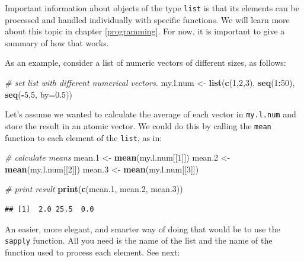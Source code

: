 \documentclass[11pt,]{book}
\newenvironment{Shaded}{\begin{snugshade}}{\end{snugshade}}
\newcommand{\KeywordTok}[1]{\textcolor[rgb]{0.27,0.27,0.27}{\textbf{#1}}}
\newcommand{\DataTypeTok}[1]{\textcolor[rgb]{0.27,0.27,0.27}{#1}}
\newcommand{\DecValTok}[1]{\textcolor[rgb]{0.06,0.06,0.06}{#1}}
\newcommand{\FloatTok}[1]{\textcolor[rgb]{0.06,0.06,0.06}{#1}}
\newcommand{\StringTok}[1]{\textcolor[rgb]{0.5,0.5,0.5}{#1}}
\newcommand{\CommentTok}[1]{\textcolor[rgb]{0.56,0.35,0.01}{\textit{#1}}}
\newcommand{\OperatorTok}[1]{\textcolor[rgb]{0.81,0.36,0.00}{\textbf{#1}}}
\newcommand{\NormalTok}[1]{#1}
\begin{document}
Important information about objects of the type \texttt{list} is that
its elements can be processed and handled individually with specific
functions. We will learn more about this topic in chapter
\ref{programming}. For now, it is important to give a summary of how
that works.

As an example, consider a list of numeric vectors of different sizes, as
follows:

\begin{Shaded}
\begin{Highlighting}[]
\CommentTok{# set list with different numerical vectors.}
\NormalTok{my.l.num <-}\StringTok{ }\KeywordTok{list}\NormalTok{(}\KeywordTok{c}\NormalTok{(}\DecValTok{1}\NormalTok{,}\DecValTok{2}\NormalTok{,}\DecValTok{3}\NormalTok{), }
                 \KeywordTok{seq}\NormalTok{(}\DecValTok{1}\OperatorTok{:}\DecValTok{50}\NormalTok{), }
                 \KeywordTok{seq}\NormalTok{(}\OperatorTok{-}\DecValTok{5}\NormalTok{,}\DecValTok{5}\NormalTok{, }\DataTypeTok{by=}\FloatTok{0.5}\NormalTok{))}
\end{Highlighting}
\end{Shaded}

Let's assume we wanted to calculate the average of each vector in
\texttt{my.l.num} and store the result in an atomic vector. We could do
this by calling the \texttt{mean} function to each element of the
\texttt{list}, as in: 

\begin{Shaded}
\begin{Highlighting}[]
\CommentTok{# calculate means}
\NormalTok{mean.}\DecValTok{1}\NormalTok{ <-}\StringTok{ }\KeywordTok{mean}\NormalTok{(my.l.num[[}\DecValTok{1}\NormalTok{]])}
\NormalTok{mean.}\DecValTok{2}\NormalTok{ <-}\StringTok{ }\KeywordTok{mean}\NormalTok{(my.l.num[[}\DecValTok{2}\NormalTok{]])}
\NormalTok{mean.}\DecValTok{3}\NormalTok{ <-}\StringTok{ }\KeywordTok{mean}\NormalTok{(my.l.num[[}\DecValTok{3}\NormalTok{]])}

\CommentTok{# print result}
\KeywordTok{print}\NormalTok{(}\KeywordTok{c}\NormalTok{(mean.}\DecValTok{1}\NormalTok{, mean.}\DecValTok{2}\NormalTok{, mean.}\DecValTok{3}\NormalTok{))}
\end{Highlighting}
\end{Shaded}

\begin{verbatim}
## [1]  2.0 25.5  0.0
\end{verbatim}

An easier, more elegant, and smarter way of doing that would be to use
the \texttt{sapply} function. All you need is the name of the list and
the name of the function used to process each element. See next:
\end{document}
